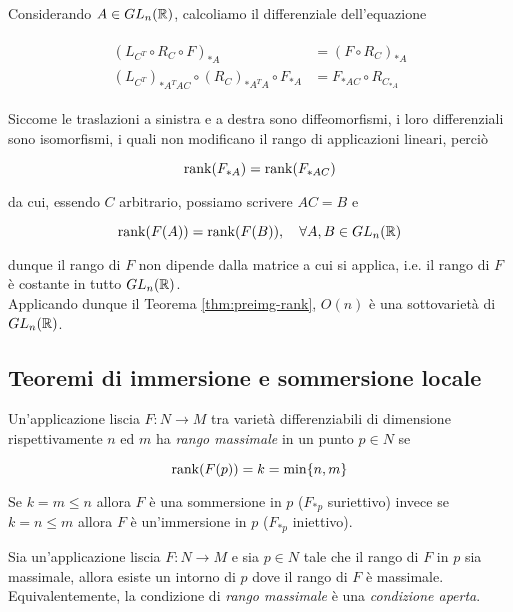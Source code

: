 Considerando $ A \in GL_{n}(\mathbb{R}) $, calcoliamo il differenziale dell'equazione

\begin{align}
	\begin{split}
		(L_{C^{T}} \circ R_{C} \circ F)_{*A} &= (F \circ R_{C})_{*A}\\
		(L_{C^{T}})_{*A^{T} A C} \circ (R_{C})_{*A^{T} A} \circ F_{*A} &= F_{*A C} \circ R_{C_{*A}}
	\end{split}
\end{align}

Siccome le traslazioni a sinistra e a destra sono diffeomorfismi, i loro differenziali sono isomorfismi, i quali non modificano il rango di applicazioni lineari, perciò

\begin{equation}
	\rank(F_{*A}) = \rank(F_{*A C})
\end{equation}

da cui, essendo $ C $ arbitrario, possiamo scrivere $ A C = B $ e

\begin{equation}
	\rank(F(A)) = \rank(F(B)) \qcomma \forall A,B \in GL_{n}(\R)
\end{equation}

dunque il rango di $ F $ non dipende dalla matrice a cui si applica, i.e. il rango di $ F $ è costante in tutto $ GL_{n}(\mathbb{R}) $.\\
Applicando dunque il Teorema \ref{thm:preimg-rank}, $ O(n) $ è una sottovarietà di $ GL_{n}(\mathbb{R}) $.

\subsection{Teoremi di immersione e sommersione locale}

Un'applicazione liscia $ F : N \to M $ tra varietà differenziabili di dimensione rispettivamente $ n $ ed $ m $ ha \textit{rango massimale} in un punto $ p \in N $ se

\begin{equation}
	\rank(F(p)) = k = \min\{n,m\}
\end{equation}

Se $ k = m \leqslant n $ allora $ F $ è una sommersione in $ p $ ($ F_{*p} $ suriettivo) invece se $ k = n \leqslant m $ allora $ F $ è un'immersione in $ p $ ($ F_{*p} $ iniettivo).

\begin{lemma}
	Sia un'applicazione liscia $ F : N \to M $ e sia $ p \in N $ tale che il rango di $ F $ in $ p $ sia massimale, allora esiste un intorno di $ p $ dove il rango di $ F $ è massimale. Equivalentemente, la condizione di \textit{rango massimale} è una \textit{condizione aperta}.
\end{lemma}

